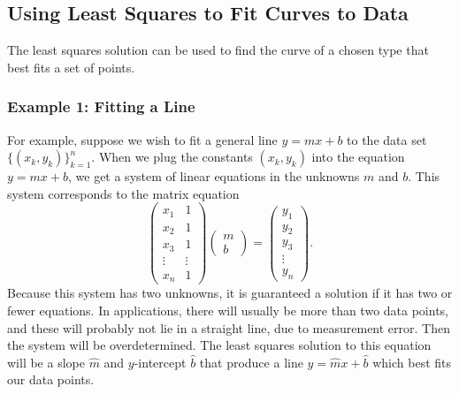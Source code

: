 \subsection*{Using Least Squares to Fit Curves to Data} %

The least squares solution can be used to find the curve of a chosen type that best fits a set of points.

\subsubsection*{Example 1: Fitting a Line} %

For example, suppose we wish to fit a general line $y=mx+b$ to the data set $\{(x_k, y_k)\}_{k=1}^n$.
When we plug the constants $(x_k, y_k)$ into the equation $y=mx+b$, we get a system of linear equations in the unknowns $m$ and $b$.
This system corresponds to the matrix equation
\[
\begin{pmatrix}
x_1 & 1\\
x_2 & 1\\
x_3 & 1\\
\vdots & \vdots\\
x_n & 1
\end{pmatrix}
\begin{pmatrix}
m\\
b
\end{pmatrix}=
\begin{pmatrix}
y_1\\
y_2\\
y_3\\
\vdots\\
y_n
\end{pmatrix}.
\]
Because this system has two unknowns, it is guaranteed a solution if it has two or fewer equations.
In applications, there will usually be more than two data points, and these will probably not lie in a straight line, due to measurement error.
Then the system will be overdetermined.
The least squares solution to this equation will be a slope $\widehat{m}$ and $y$-intercept $\widehat{b}$ that produce a line $y = \widehat{m}x+\widehat{b}$ which best fits our data points.

